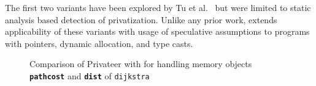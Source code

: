 The first two variants have been explored by Tu et
al.~\cite{ARRAY_privatization} but were limited to static analysis
based detection of privatization.  Unlike any prior work, \name
extends applicability of these variants with usage of speculative
assumptions to programs with pointers, dynamic allocation, and type
casts.







\lstset{basicstyle=\ttfamily, numbers=left, numberstyle=\tiny,
  stepnumber=1, numbersep=5pt}

\begin{figure}[!t]
\centering
{}
\caption{Comparison of Privateer with \name for handling memory
objects \texttt{\textbf{pathcost}} and \texttt{\textbf{dist}} of \texttt{dijkstra}}
\label{fig:dijkstra_motivation_comparison}
\end{figure}

